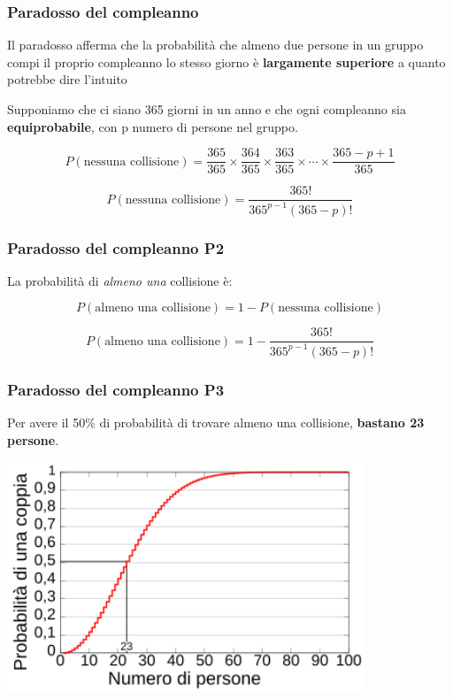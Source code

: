 \begin{frame}
	\frametitle{Paradosso del compleanno}

	Il paradosso afferma che la probabilità che almeno due persone in un gruppo compi il proprio compleanno lo stesso giorno è \textbf{largamente superiore} a quanto potrebbe dire l'intuito

	Supponiamo che ci siano 365 giorni in un anno e che ogni compleanno sia \textbf{equiprobabile}, con p numero di persone nel gruppo.

	\[
		P(\text{nessuna collisione}) = \frac{365}{365} \times \frac{364}{365} \times \frac{363}{365} \times \cdots \times \frac{365 - p + 1}{365}
	\]

	\[
		P(\text{nessuna collisione}) = \frac{365!}{365^{p-1} (365 - p)!}
	\]

\end{frame}

\begin{frame}
	\frametitle{Paradosso del compleanno P2}

	La probabilità di \textit{almeno una} collisione è:

	\[
		P(\text{almeno una collisione}) = 1 - P(\text{nessuna collisione})
	\]

	\[
		P(\text{almeno una collisione}) = 1 - \frac{365!}{365^{p-1} (365 - p)!}
	\]

\end{frame}


\begin{frame}
	\frametitle{Paradosso del compleanno P3}

	Per avere il 50\% di probabilità di trovare almeno una collisione, \textbf{bastano 23 persone}.

	\begin{center}
		\includegraphics[width=0.8\textwidth]{img/2-img/Birthday_Paradox_IT.png}
	\end{center}

\end{frame}

